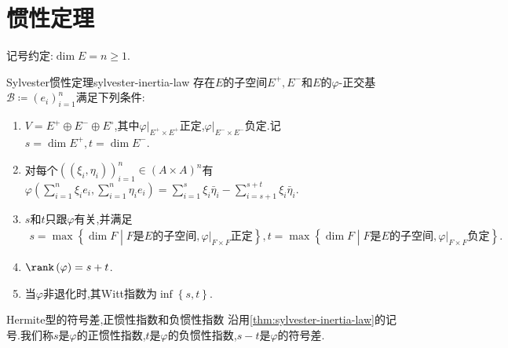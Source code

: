 \section{惯性定理}

记号约定:$\dim E=n\geq 1$.

\begin{theorem}{Sylvester惯性定理}{sylvester-inertia-law}
	存在$E$的子空间$E^{+},E^{-}$和$E$的$\varphi$-正交基$\mathcal{B}\coloneq\left(e_{i}\right)_{i=1}^{n}$满足下列条件:
	\begin{enumerate}
		\item $V=E^{+}\oplus E^{-}\oplus E^{\circ}$,其中$\varphi|_{E^{+}\times E^{+}}$正定,$\varphi|_{E^{-}\times E^{-}}$负定.记$s=\dim E^{+},t=\dim E^{-}$.
		\item 对每个$\left(\left(\xi_{i},\eta_{i}\right)\right)_{i=1}^{n}\in\left(A\times A\right)^{n}$有$\varphi\left(\sum\limits_{i=1}^{n}\xi_{i}e_{i},\sum\limits_{i=1}^{n}\eta_{i}e_{i}\right)=\sum\limits_{i=1}^{s}\xi_{i}\bar{\eta}_{i}-\sum\limits_{i=s+1}^{s+t}\xi_{i}\bar{\eta}_{i}$.
		\item $s$和$t$只跟$\varphi$有关,并满足
		\begin{align*}
			s=\max\left\{\dim F\middle|F\text{是}E\text{的子空间},\varphi|_{F\times F}\text{正定}\right\},t=\max\left\{\dim F\middle|F\text{是}E\text{的子空间},\varphi|_{F\times F}\text{负定}\right\}.
		\end{align*}
		\item $\rank\left(\varphi\right)=s+t$.
		\item 当$\varphi$非退化时,其Witt指数为$\inf\left\{s,t\right\}$.
	\end{enumerate}
\end{theorem}

\begin{definition}{Hermite型的符号差,正惯性指数和负惯性指数}{}
	沿用\cref{thm:sylvester-inertia-law}的记号.我们称$s$是$\varphi$的正惯性指数,$t$是$\varphi$的负惯性指数,$s-t$是$\varphi$的符号差.
\end{definition}